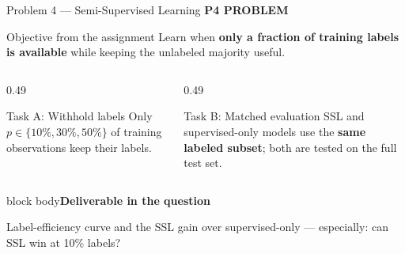 \documentclass[aspectratio=169,11pt]{beamer}
\newcommand{\sectiontag}[1]{{\footnotesize\usebeamercolor[fg]{structure}\textbf{#1}}\par\vspace{0.10cm}}
\newcommand{\factbox}[2]{\begin{beamercolorbox}[sep=0.13cm,wd=\linewidth]{block body}{\bfseries #1}\par\small #2\end{beamercolorbox}}
\begin{document}
\begin{frame}{Problem 4 — Semi-Supervised Learning}
\sectiontag{P4 \quad PROBLEM}
\begin{block}{Objective from the assignment}
Learn when \textbf{only a fraction of training labels is available} while keeping the unlabeled majority useful.
\end{block}
\begin{columns}[T,totalwidth=\textwidth]
\begin{column}{0.49\textwidth}
\begin{block}{Task A: Withhold labels}
Only $p\in\{10\%,30\%,50\%\}$ of training observations keep their labels.
\end{block}
\end{column}
\begin{column}{0.49\textwidth}
\begin{block}{Task B: Matched evaluation}
SSL and supervised-only models use the \textbf{same labeled subset}; both are tested on the full test set.
\end{block}
\end{column}
\end{columns}
\vspace{0.10cm}
\factbox{Deliverable in the question}{Label-efficiency curve and the SSL gain over supervised-only --- especially: can SSL win at 10\% labels?}
\end{frame}
\end{document}

